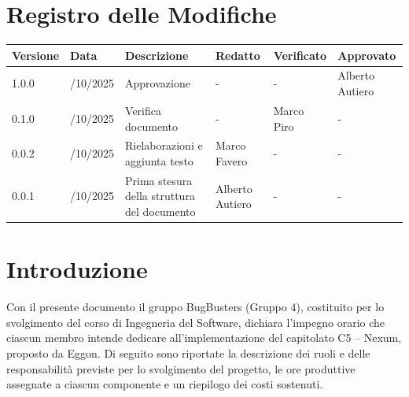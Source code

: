 \documentclass[a4paper,11pt]{article}
\newcommand{\CurrentVersion}{1.0.0}
\begin{document}
\newpage

\section*{Registro delle Modifiche}


\setlength{\extrarowheight}{2pt} %
\renewcommand{\arraystretch}{1.5} 

{\footnotesize
\begin{tabularx}{\textwidth}{|>{\raggedright\arraybackslash}p{1.5cm}|>{\raggedright\arraybackslash}p{2cm}|X|>{\raggedright\arraybackslash}p{2cm}|>{\raggedright\arraybackslash}p{2cm}|>{\raggedright\arraybackslash}p{2cm}|}
\hline
\rowcolor{primaryblue!40}
\textbf{\color{white} Versione} & \textbf{\color{white} Data} & \textbf{\color{white} Descrizione} & \textbf{\color{white} Redatto} & \textbf{\color{white} Verificato} & \textbf{\color{white} Approvato} \\
\hline
\rowcolor{secondaryblue!10} \CurrentVersion & 30/10/2025 & Approvazione & - & - & Alberto Autiero \\
\hline
\rowcolor{secondaryblue!10} 0.1.0 & 30/10/2025 & Verifica documento & - & Marco Piro & - \\
\hline
\rowcolor{secondaryblue!10} 0.0.2 & 26/10/2025 & Rielaborazioni e aggiunta testo & Marco Favero & - & - \\
\hline
\rowcolor{secondaryblue!10} 0.0.1 & 23/10/2025 & Prima stesura della struttura del documento & Alberto Autiero & - & - \\
\hline

\end{tabularx}
}




\newpage
\tableofcontents
\newpage

\section{Introduzione}
Con il presente documento il gruppo BugBusters (Gruppo 4), costituito per lo svolgimento del corso di Ingegneria del Software, 
dichiara l'impegno orario che ciascun membro intende dedicare all'implementazione del capitolato C5 -- Nexum, proposto da Eggon. 
Di seguito sono riportate la descrizione dei ruoli e delle responsabilità previste per lo svolgimento del progetto, 
le ore produttive assegnate a ciascun componente e un riepilogo dei costi sostenuti.

\newpage
\end{document}
